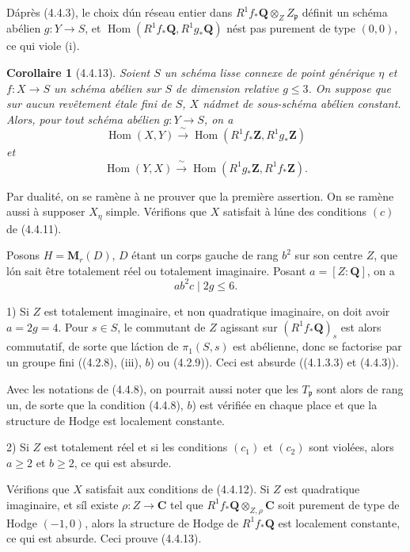 \documentclass[11pt]{amsart}
\theoremstyle{plain}
\newtheorem{cor}{Corollaire}
\theoremstyle{remark}
\DeclareMathOperator{\Hom}{Hom}
\newcommand{\Q}{\mathbf{Q}}
\newcommand{\Z}{\mathbf{Z}}
\newcommand{\C}{\mathbf{C}}
\begin{document}
D\'apr\`es (4.4.3), le choix d\'un r\'eseau entier dans $R^{1}f_{*}\Q \otimes_{Z} Z_{\mathfrak{p}}$
d\'efinit un sch\'ema ab\'elien $g : Y \to S$, et $\Hom(R^{1}f_{*}\Q, R^{1}g_{*}\Q)$ n\'est pas
purement de type $(0,0)$, ce qui viole (i).

\begin{cor}[4.4.13]
Soient $S$ un sch\'ema lisse connexe de point g\'en\'erique $\eta$ et $f : X \to S$ un sch\'ema
ab\'elien sur $S$ de dimension relative $g \leq 3$. On suppose que sur aucun rev\^etement
\'etale fini de $S$, $X$ n\'admet de sous-sch\'ema ab\'elien constant. Alors, pour tout
sch\'ema ab\'elien $g : Y \to S$, on a
\[
\Hom(X,Y) \xrightarrow{\;\sim\;} \Hom(R^{1}f_{*}\Z, R^{1}g_{*}\Z)
\]
et
\[
\Hom(Y,X) \xrightarrow{\;\sim\;} \Hom(R^{1}g_{*}\Z, R^{1}f_{*}\Z).
\]
\end{cor}

Par dualit\'e, on se ram\`ene \`a ne prouver que la premi\`ere assertion. On se ram\`ene aussi
\`a supposer $X_{\eta}$ simple. V\'erifions que $X$ satisfait \`a l\'une des conditions $(c)$ de
(4.4.11).

Posons $H = \mathbf{M}_{r}(D)$, $D$ \'etant un corps gauche de rang $b^{2}$ sur son centre $Z$,
que l\'on sait \^etre totalement r\'eel ou totalement imaginaire. Posant $a = [Z:\Q]$, on a
\begin{equation}\tag{4.4.13.1}
ab^{2}c \mid 2g \leq 6.
\end{equation}

\medskip

1) Si $Z$ est totalement imaginaire, et non quadratique imaginaire, on doit avoir
$a = 2g = 4$. Pour $s \in S$, le commutant de $Z$ agissant sur $(R^{1}f_{*}\Q)_{s}$ est alors
commutatif, de sorte que l\'action de $\pi_{1}(S,s)$ est ab\'elienne, donc se factorise par un
groupe fini ((4.2.8), (iii), $b$) ou (4.2.9)). Ceci est absurde ((4.1.3.3) et (4.4.3)).

Avec les notations de (4.4.8), on pourrait aussi noter que les $T_{\mathfrak{p}}$ sont alors de
rang un, de sorte que la condition (4.4.8), $b$) est v\'erifi\'ee en chaque place et que la
structure de Hodge est localement constante.

2) Si $Z$ est totalement r\'eel et si les conditions $(c_{1})$ et $(c_{2})$ sont viol\'ees, alors
$a \geq 2$ et $b \geq 2$, ce qui est absurde.

V\'erifions que $X$ satisfait aux conditions de (4.4.12). Si $Z$ est quadratique imaginaire,
et s\'il existe $\rho : Z \to \C$ tel que $R^{1}f_{*}\Q \otimes_{Z,\rho} \C$ soit purement de type
de Hodge $(-1,0)$, alors la structure de Hodge de $R^{1}f_{*}\Q$ est localement constante, ce qui
est absurde. Ceci prouve (4.4.13).
\end{document}
